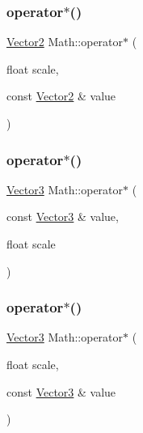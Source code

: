 \mbox{\label{namespace_math_ae64567d7ee2881978a228a6ceaeca4f4}} 
\subsubsection{\texorpdfstring{operator$\ast$()}{operator*()}\hspace{0.1cm}{\footnotesize\ttfamily [2/19]}}
{\footnotesize\ttfamily \mbox{\hyperlink{struct_math_1_1_vector2}{Vector2}} Math\+::operator$\ast$ (\begin{DoxyParamCaption}\item[{float}]{scale,  }\item[{const \mbox{\hyperlink{struct_math_1_1_vector2}{Vector2}} \&}]{value }\end{DoxyParamCaption})}

\mbox{\label{namespace_math_a94042de53627e5809c4676b6c5340963}} 
\subsubsection{\texorpdfstring{operator$\ast$()}{operator*()}\hspace{0.1cm}{\footnotesize\ttfamily [3/19]}}
{\footnotesize\ttfamily \mbox{\hyperlink{struct_math_1_1_vector3}{Vector3}} Math\+::operator$\ast$ (\begin{DoxyParamCaption}\item[{const \mbox{\hyperlink{struct_math_1_1_vector3}{Vector3}} \&}]{value,  }\item[{float}]{scale }\end{DoxyParamCaption})}

\mbox{\label{namespace_math_a0d1f5fd771b09fb7d2c8e0ebbc182f19}} 
\subsubsection{\texorpdfstring{operator$\ast$()}{operator*()}\hspace{0.1cm}{\footnotesize\ttfamily [4/19]}}
{\footnotesize\ttfamily \mbox{\hyperlink{struct_math_1_1_vector3}{Vector3}} Math\+::operator$\ast$ (\begin{DoxyParamCaption}\item[{float}]{scale,  }\item[{const \mbox{\hyperlink{struct_math_1_1_vector3}{Vector3}} \&}]{value }\end{DoxyParamCaption})}


